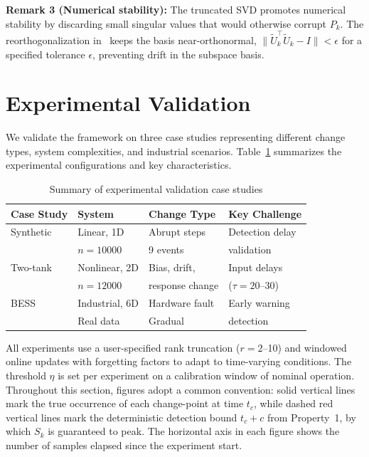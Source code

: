 \documentclass[conference]{IEEEtran}
\begin{document}
\textbf{Remark 3 (Numerical stability):} The truncated SVD promotes numerical stability by discarding small singular values that would otherwise corrupt \(P_k\). The reorthogonalization in~\cite{Zhang2022} keeps the basis near-orthonormal, \(\|\tilde{U}_k^\top \tilde{U}_k - I\| < \epsilon\) for a specified tolerance \(\epsilon\), preventing drift in the subspace basis.

\section{Experimental Validation}\label{sec:results}

We validate the framework on three case studies representing different change types, system complexities, and industrial scenarios. Table~\ref{tab:experiments} summarizes the experimental configurations and key characteristics.

\begin{table}[t]
    \caption{Summary of experimental validation case studies}\label{tab:experiments}
    \centering
    \small
    \begin{tabular}{@{}llll@{}}
        \toprule
        \textbf{Case Study} & \textbf{System} & \textbf{Change Type} & \textbf{Key Challenge} \\
        \midrule
        Synthetic           & Linear, 1D      & Abrupt steps         & Detection delay        \\
                            & \(n=10000\)     & 9 events             & validation             \\
        \midrule
        Two-tank            & Nonlinear, 2D   & Bias, drift,         & Input delays           \\
                            & \(n=12000\)     & response change      & (\(\tau=20\)--30)      \\
        \midrule
        BESS                & Industrial, 6D  & Hardware fault       & Early warning          \\
                            & Real data       & Gradual              & detection              \\
        \bottomrule
    \end{tabular}
\end{table}

All experiments use a user-specified rank truncation (\(r=2\)--10) and windowed online updates with forgetting factors to adapt to time-varying conditions. The threshold \(\eta\) is set per experiment on a calibration window of nominal operation. Throughout this section, figures adopt a common convention: solid vertical lines mark the true occurrence of each change-point at time \(t_c\), while dashed red vertical lines mark the deterministic detection bound \( t_c + c \) from Property~1, by which \(S_k\) is guaranteed to peak. The horizontal axis in each figure
shows the number of samples elapsed since the experiment start.
\end{document}
